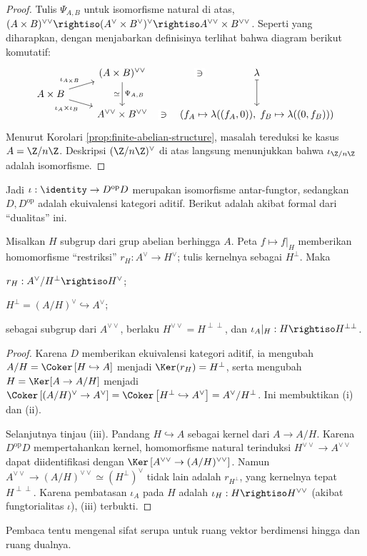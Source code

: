 \begin{proof}
	Tulis $\Psi_{A,B}$ untuk isomorfisme natural di atas, $(A \times B)^{\vee\vee} \rightiso (A^\vee \times B^\vee)^\vee \rightiso A^{\vee\vee} \times B^{\vee\vee}$. Seperti yang diharapkan, dengan menjabarkan definisinya terlihat bahwa diagram berikut komutatif:
	\[\begin{tikzcd}[row sep=tiny]
		& (A \times B)^{\vee\vee} \arrow[dd, "\simeq"', "\Psi_{A,B}"] & \lambda \arrow[phantom, l, "\ni" description, sloped] \arrow[mapsto, dd] \\
		A \times B \arrow[ru, "{\iota_{A \times B}}"] \arrow[rd, "\iota_A \times \iota_B"'] & \\
		& A^{\vee\vee} \times B^{\vee\vee} & \arrow[phantom, l, "\ni" description, sloped] \left( f_A \mapsto \lambda((f_A, 0)), \; f_B \mapsto \lambda((0, f_B)) \right)
	\end{tikzcd}\]
	Menurut Korolari \ref{prop:finite-abelian-structure}, masalah tereduksi ke kasus $A = \Z/n\Z$. Deskripsi $(\Z/n\Z)^\vee$ di atas langsung menunjukkan bahwa $\iota_{\Z/n\Z}$ adalah isomorfisme.
\end{proof}
Jadi $\iota: \identity \to D^\text{op} D$ merupakan isomorfisme antar-fungtor, sedangkan $D, D^\text{op}$ adalah ekuivalensi kategori aditif. Berikut adalah akibat formal dari ``dualitas'' ini.

\begin{corollary}\label{prop:finite-duality-2}
	Misalkan $H$ subgrup dari grup abelian berhingga $A$. Peta $f \mapsto f|_H$ memberikan homomorfisme ``restriksi'' $r_H: A^\vee \to H^\vee$; tulis kernelnya sebagai $H^\perp$. Maka
	\begin{compactenum}[(i)]
		\item $r_H: A^\vee/H^\perp \rightiso H^\vee$;
		\item $H^\perp = (A/H)^\vee \hookrightarrow A^\vee$;
		\item sebagai subgrup dari $A^{\vee\vee}$, berlaku $H^{\vee\vee} = H^{\perp\perp}$, dan $\iota_A|_H: H \rightiso H^{\perp\perp}$.
	\end{compactenum}
\end{corollary}
\begin{proof}
	Karena $D$ memberikan ekuivalensi kategori aditif, ia mengubah $A/H = \Coker\left[H \hookrightarrow A\right]$ menjadi $\Ker(r_H) = H^\perp$, serta mengubah $H = \Ker[A \to A/H]$ menjadi $\Coker\left[ (A/H)^\vee \to A^\vee \right] = \Coker\left[ H^\perp \hookrightarrow A^\vee \right] = A^\vee/H^\perp$. Ini membuktikan (i) dan (ii).
	
	Selanjutnya tinjau (iii). Pandang $H \hookrightarrow A$ sebagai kernel dari $A \to A/H$. Karena $D^\text{op} D$ mempertahankan kernel, homomorfisme natural terinduksi $H^{\vee\vee} \to A^{\vee\vee}$ dapat diidentifikasi dengan $\Ker\left[ A^{\vee\vee} \to (A/H)^{\vee\vee}\right]$. Namun $A^{\vee\vee} \to (A/H)^{\vee\vee} \simeq (H^\perp)^\vee$ tidak lain adalah $r_{H^\perp}$, yang kernelnya tepat $H^{\perp\perp}$. Karena pembatasan $\iota_A$ pada $H$ adalah $\iota_H: H \rightiso H^{\vee\vee}$ (akibat fungtorialitas $\iota$), (iii) terbukti.
\end{proof}
Pembaca tentu mengenal sifat serupa untuk ruang vektor berdimensi hingga dan ruang dualnya.
 
